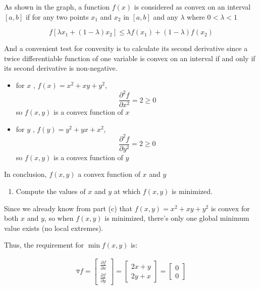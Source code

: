 \documentclass[11pt]{article}
\providecommand{\tightlist}{%
      \setlength{\itemsep}{0pt}\setlength{\parskip}{0pt}}
\begin{document}
As shown in the graph, a function \(f(x)\) is considered as convex on an
interval \([a,b]\) if for any two points \(x_1\) and \(x_2\) in
\([a,b]\) and any \(\lambda\) where \(0<\lambda<1\)

\[ f[\lambda x_1+(1-\lambda)x_2] \le \lambda f(x_1)+(1-\lambda)f(x_2) \]

And a convenient test for convexity is to calculate its second
derivative since a twice differentiable function of one variable is
convex on an interval if and only if its second derivative is
non-negative.

\begin{itemize}
\item
  for \(x\) , \(f(x) = x^2+xy +y^2\),
  \[\frac{\partial^2 f}{\partial x^2} = 2 \ge 0\] so \(f(x,y)\) is a
  convex function of \(x\)
\item
  for \(y\) , \(f(y) = y^2+yx +x^2\),
  \[\frac{\partial^2 f}{\partial y^2} = 2 \ge 0\] so \(f(x,y)\) is a
  convex function of \(y\)
\end{itemize}

In conclusion, \(f(x, y)\) a convex function of \(x\) and \(y\)

    \begin{enumerate}
\def\labelenumi{(\alph{enumi})}
\setcounter{enumi}{3}
\tightlist
\item
  Compute the values of \(x\) and \(y\) at which \(f(x, y)\) is
  minimized.
\end{enumerate}

    Since we already know from part (c) that \(f(x,y) = x^2+xy+y^2\) is
convex for both \(x\) and \(y\), so when \(f(x, y)\) is minimized,
there's only one global minimum value exists (no local extremes).

Thus, the requirement for \(\min f(x, y)\) is:

\begin{align} \triangledown f =
\begin{bmatrix} \frac{\partial f}{\partial x} 
\\  \frac{\partial f}{\partial y } 
\end{bmatrix} = 
\begin{bmatrix} 2x+y
\\  2y+x
\end{bmatrix} = 
\begin{bmatrix} 0
\\  0
\end{bmatrix} 
\end{align}
\end{document}
